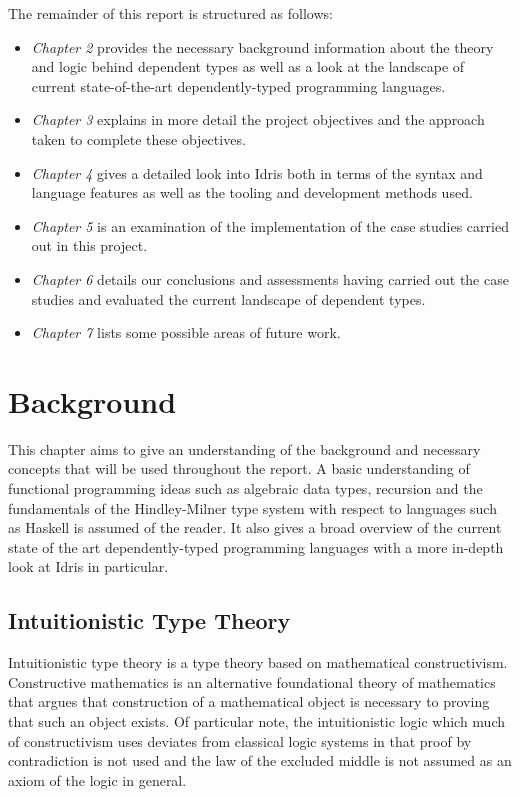\documentclass[a4paper, notitlepage]{report}
\begin{document}
The remainder of this report is structured as follows:
\begin{itemize}
\item \emph{Chapter 2} provides the necessary background information about the theory and
logic behind dependent types as well as a look at the landscape of current
state-of-the-art dependently-typed programming languages.
\item \emph{Chapter 3} explains in more detail the project objectives and the approach
taken to complete these objectives.
\item \emph{Chapter 4} gives a detailed look into Idris both in terms of the syntax and
language features as well as the tooling and development methods used.
\item \emph{Chapter 5} is an examination of the implementation of the case studies carried
out in this project.
\item \emph{Chapter 6} details our conclusions and assessments having carried out the case
studies and evaluated the current landscape of dependent types.
\item \emph{Chapter 7} lists some possible areas of future work.
\end{itemize}
\chapter{Background}
\label{sec:orgc98f3e1}
This chapter aims to give an understanding of the background and necessary
concepts that will be used throughout the report. A basic understanding of
functional programming ideas such as algebraic data types, recursion and the
fundamentals of the Hindley-Milner type system with respect to languages such as
Haskell is assumed of the reader. It also gives a broad overview of the current
state of the art dependently-typed programming languages with a more in-depth
look at Idris in particular.

\section{Intuitionistic Type Theory}
\label{sec:orgb72d040}
Intuitionistic type theory is a type theory based on mathematical
constructivism. Constructive mathematics is an alternative foundational theory
of mathematics that argues that construction of a mathematical object is
necessary to proving that such an object exists. Of particular note, the
intuitionistic logic which much of constructivism uses deviates from classical
logic systems in that proof by contradiction is not used and the law of the
excluded middle is not assumed as an axiom of the logic in general.
\end{document}
